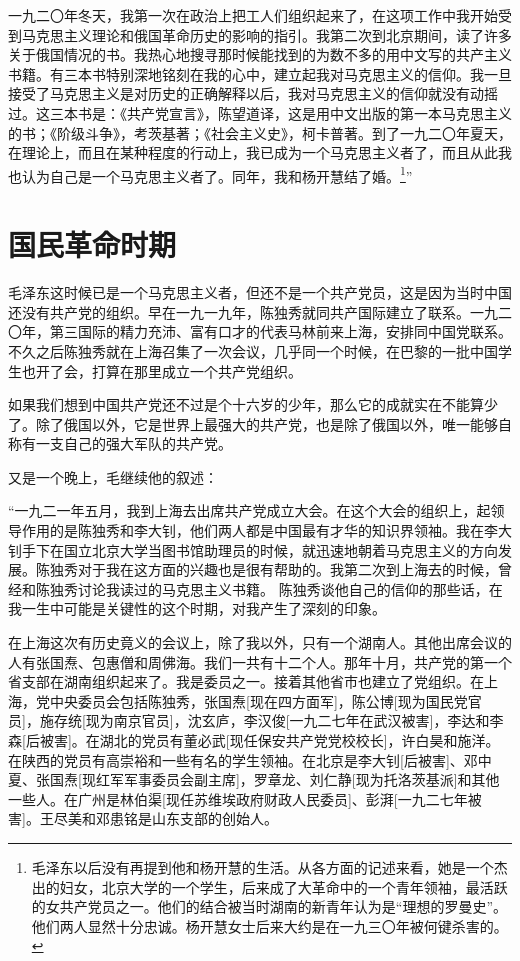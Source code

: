 \documentclass[10pt]{book}
\begin{document}
一九二〇年冬天，我第一次在政治上把工人们组织起来了，在这项工作中我开始受到马克思主义理论和俄国革命历史的影响的指引。我第二次到北京期间，读了许多关于俄国情况的书。我热心地搜寻那时候能找到的为数不多的用中文写的共产主义书籍。有三本书特别深地铭刻在我的心中，建立起我对马克思主义的信仰。我一旦接受了马克思主义是对历史的正确解释以后，我对马克思主义的信仰就没有动摇过。这三本书是：《共产党宣言》，陈望道译，这是用中文出版的第一本马克思主义的书；《阶级斗争》，考茨基著；《社会主义史》，柯卡普著。到了一九二〇年夏天，在理论上，而且在某种程度的行动上，我已成为一个马克思主义者了，而且从此我也认为自己是一个马克思主义者了。同年，我和杨开慧结了婚。\footnote{毛泽东以后没有再提到他和杨开慧的生活。从各方面的记述来看，她是一个杰出的妇女，北京大学的一个学生，后来成了大革命中的一个青年领袖，最活跃的女共产党员之一。他们的结合被当时湖南的新青年认为是“理想的罗曼史”。他们两人显然十分忠诚。杨开慧女士后来大约是在一九三〇年被何键杀害的。}”



\section{国民革命时期}

毛泽东这时候已是一个马克思主义者，但还不是一个共产党员，这是因为当时中国还没有共产党的组织。早在一九一九年，陈独秀就同共产国际建立了联系。一九二〇年，第三国际的精力充沛、富有口才的代表马林前来上海，安排同中国党联系。不久之后陈独秀就在上海召集了一次会议，几乎同一个时候，在巴黎的一批中国学生也开了会，打算在那里成立一个共产党组织。

如果我们想到中国共产党还不过是个十六岁的少年，那么它的成就实在不能算少了。除了俄国以外，它是世界上最强大的共产党，也是除了俄国以外，唯一能够自称有一支自己的强大军队的共产党。

又是一个晚上，毛继续他的叙述：

“一九二一年五月，我到上海去出席共产党成立大会。在这个大会的组织上，起领导作用的是陈独秀和李大钊，他们两人都是中国最有才华的知识界领袖。我在李大钊手下在国立北京大学当图书馆助理员的时候，就迅速地朝着马克思主义的方向发展。陈独秀对于我在这方面的兴趣也是很有帮助的。我第二次到上海去的时候，曾经和陈独秀讨论我读过的马克思主义书籍。 陈独秀谈他自己的信仰的那些话，在我一生中可能是关键性的这个时期，对我产生了深刻的印象。

在上海这次有历史竟义的会议上，除了我以外，只有一个湖南人。其他出席会议的人有张国焘、包惠僧和周佛海。我们一共有十二个人。那年十月，共产党的第一个省支部在湖南组织起来了。我是委员之一。接着其他省市也建立了党组织。在上海，党中央委员会包括陈独秀，张国焘[现在四方面军]，陈公博[现为国民党官员]，施存统[现为南京官员]，沈玄庐，李汉俊[一九二七年在武汉被害]，李达和李森[后被害]。在湖北的党员有董必武[现任保安共产党党校校长]，许白昊和施洋。在陕西的党员有高崇裕和一些有名的学生领袖。在北京是李大钊[后被害]、邓中夏、张国焘[现红军军事委员会副主席]，罗章龙、刘仁静[现为托洛茨基派]和其他一些人。在广州是林伯渠[现任苏维埃政府财政人民委员]、彭湃[一九二七年被害]。王尽美和邓患铭是山东支部的创始人。
\end{document}
